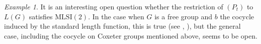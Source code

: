 \documentclass[12pt,a4paper]{amsart}
\newcommand{\1}{\mathds{1}}
\renewcommand{\phi}{\varphi}
\newcommand{\cb}{\mathrm{cb}}
\newcommand{\norm}[1]{\lVert#1\rVert}
\theoremstyle{plain}
\theoremstyle{definition}
\theoremstyle{remark}
\newtheorem{example}[proposition]{Example}
\begin{document}
\begin{example}
    It is an interesting open question whether the restriction of $(P_t)$ to $L(G)$ satisfies $\mathrm{MLSI}(2)$. In the case when $G$ is a free group and $b$ the cocycle induced by the standard length function, this is true (see \cite[Example 5.16]{WZ21}, \cite[Corollary 5.8]{BGJ23}), but the general case, including the cocycle on Coxeter groups mentioned above, seems to be open.
\end{example}

\end{document}
